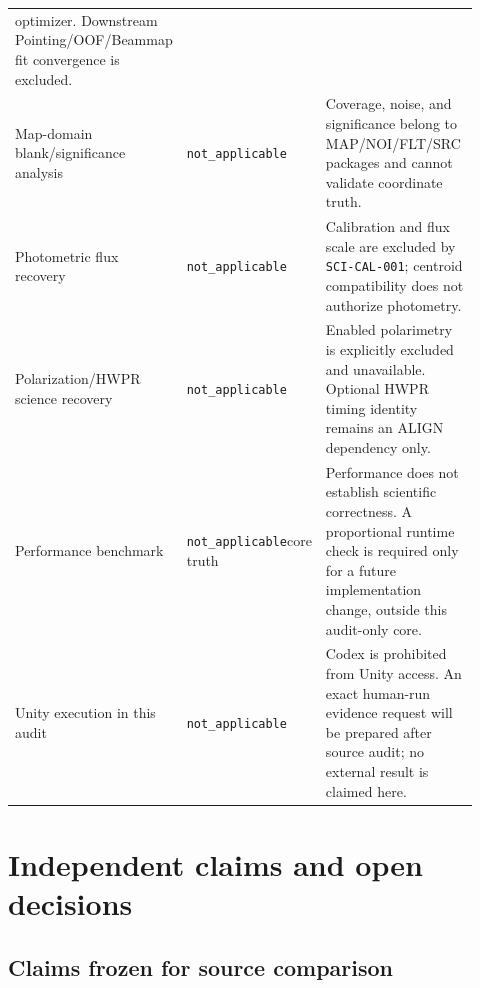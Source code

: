 \documentclass[11pt]{article}
\newcommand{\NA}{\texttt{not\_applicable}}
\begin{document}
\begin{longtable}{>{\raggedright\arraybackslash}p{0.23\linewidth}
                  >{\raggedright\arraybackslash}p{0.22\linewidth}
                  >{\raggedright\arraybackslash}p{0.47\linewidth}}
optimizer.  Downstream Pointing/OOF/Beammap fit convergence is excluded. \\
Map-domain blank/significance analysis & \NA & Coverage, noise, and
significance belong to MAP/NOI/FLT/SRC packages and cannot validate coordinate
truth. \\
Photometric flux recovery & \NA & Calibration and flux scale are excluded by
\texttt{SCI-CAL-001}; centroid compatibility does not authorize photometry.
\\
Polarization/HWPR science recovery & \NA & Enabled polarimetry is explicitly
excluded and unavailable.  Optional HWPR timing identity remains an ALIGN
dependency only. \\
Performance benchmark & \NA{}\newline core truth & Performance does not establish
scientific correctness.  A proportional runtime check is required only for a
future implementation change, outside this audit-only core. \\
Unity execution in this audit & \NA & Codex is prohibited from Unity access.
An exact human-run evidence request will be prepared after source audit; no
external result is claimed here. \\
\bottomrule
\end{longtable}

\section{Independent claims and open decisions}

\subsection{Claims frozen for source comparison}
\end{document}
